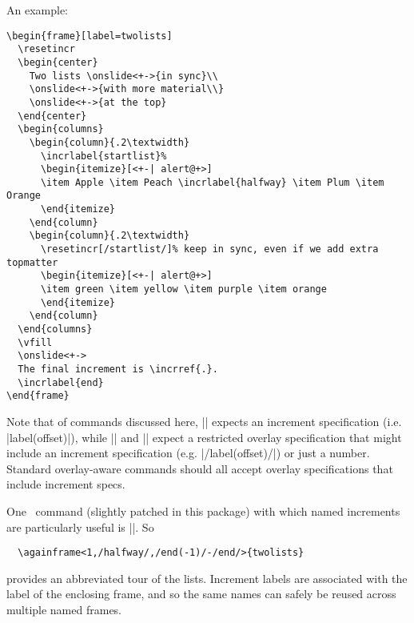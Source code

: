 \documentclass[a4paper]{ltxdoc}
\begin{document}
An example:
\example
\begin{verbatim}
\begin{frame}[label=twolists]
  \resetincr
  \begin{center}
    Two lists \onslide<+->{in sync}\\
    \onslide<+->{with more material\\}
    \onslide<+->{at the top}
  \end{center}
  \begin{columns}
    \begin{column}{.2\textwidth}
      \incrlabel{startlist}%
      \begin{itemize}[<+-| alert@+>]
      \item Apple \item Peach \incrlabel{halfway} \item Plum \item Orange
      \end{itemize}
    \end{column}
    \begin{column}{.2\textwidth}
      \resetincr[/startlist/]% keep in sync, even if we add extra topmatter
      \begin{itemize}[<+-| alert@+>]
      \item green \item yellow \item purple \item orange
      \end{itemize}
    \end{column}
  \end{columns}
  \vfill
  \onslide<+->
  The final increment is \incrref{.}. 
  \incrlabel{end}
\end{frame}
\end{verbatim}

Note that of commands discussed here, |\incrref| expects an increment
specification (i.e. |label(offset)|), while |\fromincr| and |\resetincr| expect
a restricted overlay specification that might include an increment specification
(e.g. |/label(offset)/|) or just a number.  Standard overlay-aware commands
should all accept overlay specifications that include increment specs.

One \beamer\ command (slightly patched in this package) with which named
increments are particularly useful is |\againframe|.  So \example
\begin{verbatim}
  \againframe<1,/halfway/,/end(-1)/-/end/>{twolists}
\end{verbatim}
provides an abbreviated tour of the lists.  Increment labels are associated with
the label of the enclosing frame, and so the same names can safely be reused
across multiple named frames.
\end{document}
